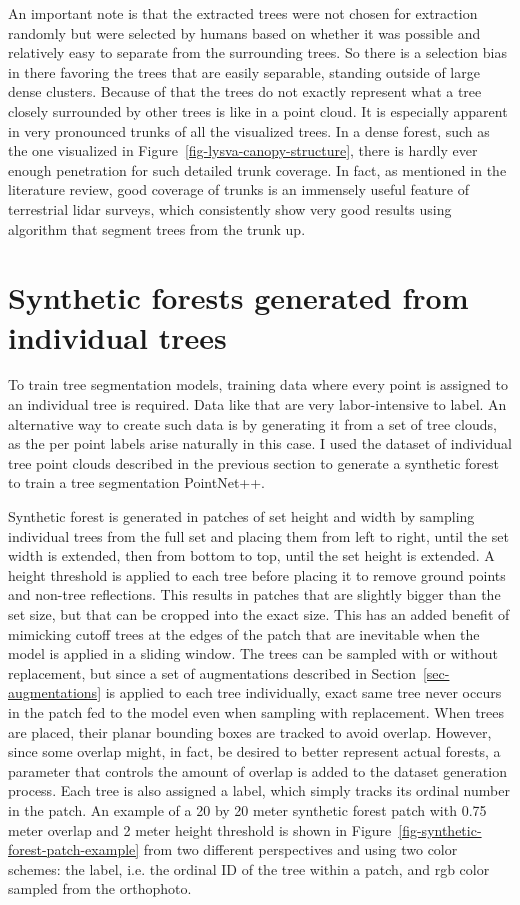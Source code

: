 An important note is that the extracted trees were not chosen for extraction randomly but were selected by humans based on whether it was possible and relatively easy to separate from the surrounding trees.
So there is a selection bias in there favoring the trees that are easily separable, standing outside of large dense clusters.
Because of that the trees do not exactly represent what a tree closely surrounded by other trees is like in a point cloud.
It is especially apparent in very pronounced trunks of all the visualized trees.
In a dense forest, such as the one visualized in Figure~\ref{fig-lysva-canopy-structure}, there is hardly ever enough penetration for such detailed trunk coverage.
In fact, as mentioned in the literature review, good coverage of trunks is an immensely useful feature of terrestrial \gls{lidar} surveys, which consistently show very good results using algorithm that segment trees from the trunk up.

\section{Synthetic forests generated from individual trees}\label{sec-synthetic-forest-dataset}

To train tree segmentation models, training data where every point is assigned to an individual tree is required.
Data like that are very labor-intensive to label.
An alternative way to create such data is by generating it from a set of tree clouds, as the per point labels arise naturally in this case.
I used the dataset of individual tree point clouds described in the previous section to generate a synthetic forest to train a tree segmentation PointNet++.

Synthetic forest is generated in patches of set height and width by sampling individual trees from the full set and placing them from left to right, until the set width is extended, then from bottom to top, until the set height is extended.
A height threshold is applied to each tree before placing it to remove ground points and non-tree reflections.
This results in patches that are slightly bigger than the set size, but that can be cropped into the exact size.
This has an added benefit of mimicking cutoff trees at the edges of the patch that are inevitable when the model is applied in a sliding window.
The trees can be sampled with or without replacement, but since a set of augmentations described in Section~\ref{sec-augmentations} is applied to each tree individually, exact same tree never occurs in the patch fed to the model even when sampling with replacement.
When trees are placed, their planar bounding boxes are tracked to avoid overlap.
However, since some overlap might, in fact, be desired to better represent actual forests, a parameter that controls the amount of overlap is added to the dataset generation process.
Each tree is also assigned a label, which simply tracks its ordinal number in the patch.
An example of a 20 by 20 meter synthetic forest patch with 0.75 meter overlap and 2 meter height threshold is shown in Figure~\ref{fig-synthetic-forest-patch-example} from two different perspectives and using two color schemes: the label, i.e. the ordinal ID of the tree within a patch, and \gls{rgb} color sampled from the orthophoto.

